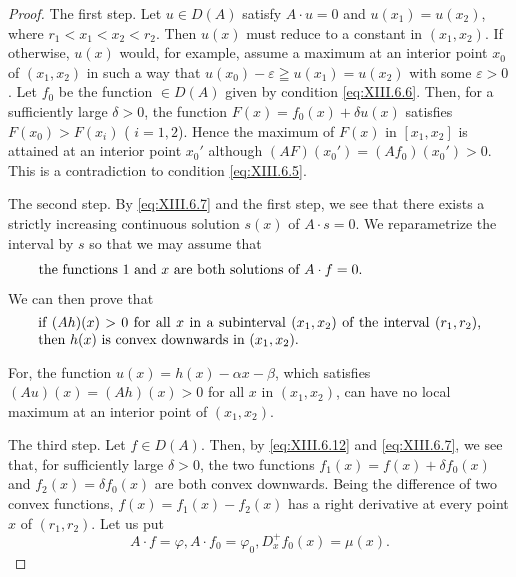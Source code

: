 \begin{proof}
 The first step. Let $u \in D(A)$ satisfy $A \cdot u = 0$ and $u(x_1) = u(x_2)$, where $r_1 < x_1 < x_2 < r_2$. Then $u(x)$ must reduce to a constant in $(x_1, x_2)$. If otherwise, $u(x)$ would, for example, assume a maximum at an interior point $x_0$ of $(x_1, x_2)$ in such a way that $u(x_0) - \varepsilon \geqq u(x_1) = u(x_2)$ with some $\varepsilon > 0$. Let $f_0$ be the function $\in D(A)$ given by condition \eqref{eq:XIII.6.6}. Then, for a sufficiently large $\delta > 0$, the function $F(x) = f_0(x) + \delta u(x)$ satisfies $F(x_0) > F(x_i)$ ( $i = 1, 2$). Hence the maximum of $F(x)$ in $[x_1, x_2]$ is attained at an interior point $x_0'$ although $(AF)(x_0') = (Af_0)(x_0') > 0$. This is a contradiction to condition \eqref{eq:XIII.6.5}. 


The second step. By \eqref{eq:XIII.6.7} and the first step, we see that there exists a strictly increasing continuous solution $s(x)$ of $A \cdot s = 0$. We reparametrize the interval by $s$ so that we may assume that 
\begin{equation}
\label{eq:XIII.6.11}
\begin{minipage}{0.92\linewidth}
\everymath{}\let\limits\nolimits
the functions $1$ and $x$ are both solutions of $A \cdot f = 0.$
\end{minipage}
\end{equation}
We can then prove that 
\begin{equation}\label{eq:XIII.6.12}
\parbox{0.92\linewidth}{\everymath{}\let\limits\nolimits if $(Ah)(x) > 0$ for all $x$ in a subinterval $(x_{1}, x_{2})$ of the interval $(r_1, r_2)$, then $h(x)$ is convex downwards in $(x_1, x_2)$.}
\end{equation}


For, the function $u(x) = h(x) - \alpha x - \beta$, which satisfies $(Au)(x) = (Ah)(x) > 0$ for all $x$ in $(x_1, x_2)$, can have no local maximum at an interior point of $(x_1, x_2)$. 

The third step. Let $f \in D(A)$. Then, by \eqref{eq:XIII.6.12} and \eqref{eq:XIII.6.7}, we see that, for sufficiently large $\delta > 0$, the two functions $f_{1}(x) = f(x) + \delta f_{0}(x)$ and $f_{2}(x) = \delta f_{0}(x)$ are both convex downwards. Being the difference of two convex functions, $f(x) = f_{1}(x) - f_{2}(x)$ has a right derivative at every point $x$ of $(r_{1}, r_{2})$. Let us put 
\begin{equation}\label{eq:XIII.6.13}
A \cdot f = \varphi , A \cdot f _{0} = \varphi_{0}, D _{x} ^{+} f _{0} (x) = \mu (x).
\end{equation}


\end{proof}
